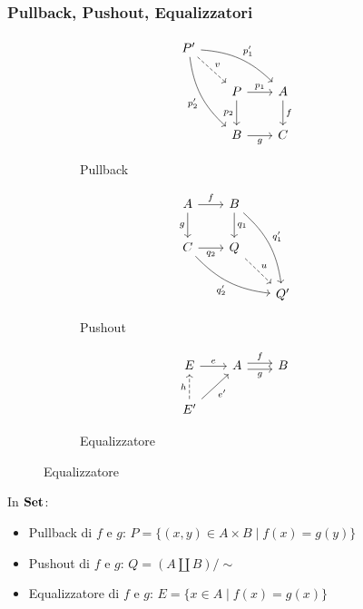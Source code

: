 \documentclass[8pt]{beamer}
\begin{document}
\begin{frame}[fragile]\frametitle{Pullback, Pushout, Equalizzatori}
	\begin{figure}[h]
		\begin{subfigure}{0.25\textwidth}
			\[\begin{tikzcd}[row sep = 20, column sep = 20]
				P' \arrow[dr, dashed, "v"] \arrow[drr, "{p_1'}", bend left=20] \arrow[ddr, "{p_2'}"swap, bend right=20] & & \\
 									& P \arrow[r, "{p_1}"] \arrow[d, "{p_2}"swap] 			& A \arrow[d, "f"] \\
									& B \arrow[r, "g"swap] 						& C
			\end{tikzcd}\]
			\caption{Pullback}
			\label{fig:pg}
		\end{subfigure}
		\qquad
		\begin{subfigure}{0.25\textwidth}
			\[\begin{tikzcd}[row sep = 20, column sep = 20]
				A \arrow[r, "f"] \arrow[d, "g"swap] 	& B \arrow[d, "{q_1}"] 	\arrow[ddr, "{q_1'}", bend left=20]	& \\
				C \arrow[r, "{q_2}"swap]  \arrow[drr, "{q_2'}"swap, bend right=20] & Q \arrow[dr, dashed, "u"] 	& \\
							& 				& Q'
			\end{tikzcd}\]
			\caption{Pushout}
			\label{po}
		\end{subfigure}
		\qquad
		\begin{subfigure}{0.25\textwidth}
			\[\begin{tikzcd}[row sep = 20, column sep = 20]
				E \arrow[r, "e"] & A \arrow[r, "f", shift left=1] \arrow[r,"g"swap, shift right = 1] & B \\
				E' \arrow[u, dashed, "h"] \arrow[ur, "{e'}"swap] &
			\end{tikzcd}\]
			\caption{Equalizzatore}
			\label{eq}
		\end{subfigure}
	\end{figure}

	In $\mathbf{Set}$:
	\begin{itemize}
		\item Pullback di $f$ e $g$: $ P = \{(x, y) \in A \times B \mid f(x) = g (y)\}$
		\item Pushout di $f$ e $g$:  $Q = (A \coprod B)/\sim$
		\item Equalizzatore di $f$ e $g$: $E=\{x \in A \mid f(x) = g(x)\}$
	\end{itemize}
\end{frame}
\end{document}
